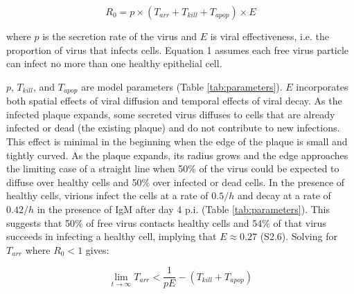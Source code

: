 \documentclass[10pt]{article}
\begin{document}
\begin{equation}
R_0 = p \times (T_{arr} + T_{kill} + T_{apop}) \times E
\end{equation}

\noindent where $p$ is the secretion rate of the virus and $E$ is viral effectiveness, i.e. the proportion of virus that infects cells.  Equation 1 assumes each free virus particle can infect no more than one healthy epithelial cell.



$p$, $T_{kill}$, and $T_{apop}$ are model parameters (Table \ref{tab:parameters}).  $E$ incorporates both spatial effects of viral diffusion and temporal effects of viral decay.  As the infected plaque expands, some secreted virus diffuses to cells that are already infected or dead (the existing plaque) and do not contribute to new infections.  This effect is minimal in the beginning when the edge of the plaque is small and tightly curved.  As the plaque expands, its radius grows and the edge approaches the limiting case of a straight line when 50\% of the virus could be expected to diffuse over healthy cells and 50\% over infected or dead cells.  In the presence of healthy cells, virions infect the cells at a rate of $0.5/h$ and decay at a rate of $0.42/h$ in the presence of IgM after day 4 p.i.  (Table \ref{tab:parameters}).  This suggests that 50\% of free virus contacts healthy cells and 54\% of that virus succeeds in infecting a healthy cell, implying that $E \approx 0.27$ (S2.6).  Solving for $T_{arr}$ where $R_0 < 1$ gives:

\begin{equation}
\lim_{t \to \infty} T_{arr} < \frac{1}{pE} - (T_{kill} + T_{apop})
\end{equation}
\end{document}
